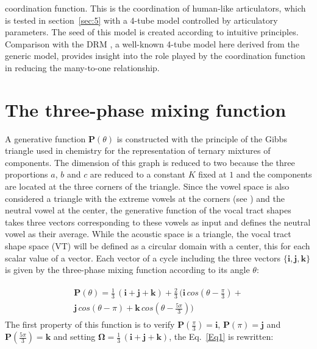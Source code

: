 \documentclass[10pt,twocolumn]{article}
\newcommand{\linenomath}{}                 %
\let\cite\citep                             %
\begin{document}
coordination function. This is the coordination of human-like articulators, which is tested in section~\ref{sec:5} with a 4-tube model controlled by articulatory parameters. The seed of this model is created according to intuitive principles. Comparison with the DRM \cite{Mrayati1988}, a well-known 4-tube model here derived from the generic model, provides insight into the role played by the coordination function in reducing the many-to-one relationship.

\section{\label{sec:2} The three-phase mixing function}
A generative function $\bm{P}(\theta)$ is constructed with the principle of the Gibbs triangle used in chemistry for the representation of ternary mixtures of components. The dimension of this graph is reduced to two because the three proportions $a$, $b$ and $c$ are reduced to a constant $K$ fixed at $1$ and the components are located at the three corners of the triangle. Since the vowel space is also considered a triangle with the extreme vowels \textipa{[u,a,i]} at the corners (see \cite{Boe2019}) and the neutral vowel \textipa{[@]} at the center, the generative function of the vocal tract shapes takes three vectors corresponding to these vowels as input and defines the neutral vowel as their average. While the acoustic space is a triangle, the vocal tract shape space (VT) will be defined as a circular domain with a center, this for each scalar value of a vector. Each vector of a cycle including the three vectors $\{\bm{i},\bm{j}, \bm{k}\}$ is given by the three-phase mixing function according to its angle $\theta$:
\linenomath
\begin{align}
\begin{split}
\bm{P}(\theta) = \frac {1}{3}\,(\bm{i}+\bm{j}+\bm{k}) + \frac {2}{3} \,(\bm{i}\,cos(\theta - \frac{\pi}{3}) + \\
\bm{j}\,cos(\theta - \pi) + \bm{k}\,cos(\theta - \frac{5\pi}{3})) \label{Eq1}
\end{split}
\end{align}
The first property of this function is to verify $\bm{P}(\frac{\pi}{3})=\bm{i}$, $\bm{P}(\pi)=\bm{j}$ and $\bm{P}(\frac{5\pi}{3})=\bm{k}$ and setting $\bm{\Omega}=\frac {1}{3}\,(\bm{i}+\bm{j}+\bm{k})$, the Eq.~\ref{Eq1} is rewritten:
\end{document}
